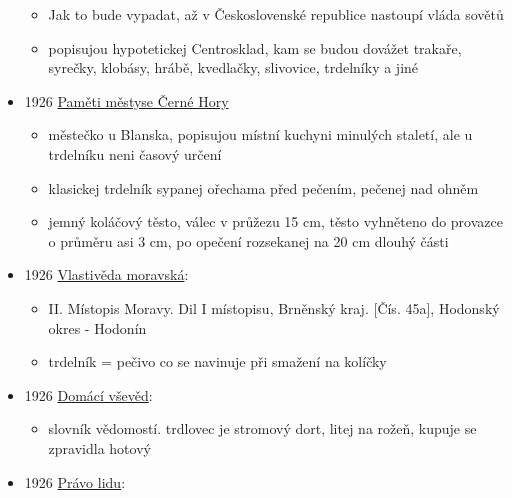 \begin{itemize}
  \begin{itemize}
  \tightlist
  \item
    Jak to bude vypadat, až v Československé republice nastoupí vláda
    sovětů
  \item
    popisujou hypotetickej Centrosklad, kam se budou dovážet trakaře,
    syrečky, klobásy, hrábě, kvedlačky, slivovice, trdelníky a jiné
  \end{itemize}
\item
  1926
  \href{https://ndk.cz/view/uuid:be635380-b1b9-11ed-826c-005056827e52?page=uuid\%3A9ae6ef00-82cb-438b-8727-ef820bed7a49}{Paměti
  městyse Černé Hory}

  \begin{itemize}
  \tightlist
  \item
    městečko u Blanska, popisujou místní kuchyni minulých staletí, ale u
    trdelníku neni časový určení
  \item
    klasickej trdelník sypanej ořechama před pečením, pečenej nad ohněm
  \item
    jemný koláčový těsto, válec v průžezu 15 cm, těsto vyhněteno do
    provazce o průměru asi 3 cm, po opečení rozsekanej na 20 cm dlouhý
    části
  \end{itemize}
\item
  1926
  \href{https://www.digitalniknihovna.cz/mzk/uuid/uuid:3ffb22b9-dde8-4a93-b4f9-7eb3f9242f73}{Vlastivěda
  moravská}:

  \begin{itemize}
  \tightlist
  \item
    II. Místopis Moravy. Dil I místopisu, Brněnský kraj. {[}Čís. 45a{]},
    Hodonský okres - Hodonín
  \item
    trdelník = pečivo co se navinuje při smažení na kolíčky
  \end{itemize}
\item
  1926
  \href{https://ceskadigitalniknihovna.cz/view/uuid:42a39d90-3138-11ea-a83e-005056827e51?page=uuid\%3A0cfdfefd-f5fd-45f2-9d3e-cb5a4563b2c2&fulltext=trdlovec&source=mzk}{Domácí
  vševěd}:

  \begin{itemize}
  \tightlist
  \item
    slovník vědomostí. trdlovec je stromový dort, litej na rožeň, kupuje
    se zpravidla hotový
  \end{itemize}
\item
  1926
  \href{https://ceskadigitalniknihovna.cz/view/uuid:b91df880-8a84-11ef-bcc2-005056825209?page=uuid\%3A3da0dc0d-49de-4574-b04d-eeda66a7b25a&fulltext=trdeln\%C3\%ADk\%20OR\%20trdeln\%C3\%ADky\%20OR\%20trdeln\%C3\%ADk\%C5\%AF&source=nkp}{Právo
  lidu}:


\end{itemize}
